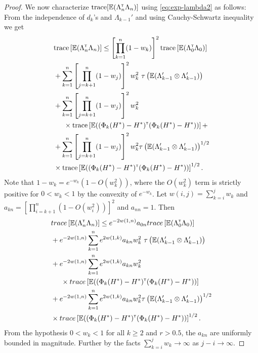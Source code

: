 \begin{proof}
We now characterize $\text{trace}[\mathbb{E}(\Lambda_n^\mathsf{\scriptscriptstyle T} \Lambda_n)]$ using \eqref{eq:exp-lambda2} as follows:
From the independence of $d_k$'s and $\Lambda_{k-1}'$ and using Cauchy-Schwartz inequality we get 
 \begin{align}\label{eq:trace}
 & \text{trace} \left[\mathbb{E} (\Lambda_n ^\mathsf{\scriptscriptstyle T} \Lambda_n)\right] \leq \left[ \prod_{k=1}^n (1-w_k) \right]^2 \text{trace} \left[\mathbb{E} (\Lambda_0 ^\mathsf{\scriptscriptstyle T} \Lambda_0)\right]  \nonumber\\ &+ \sum_{k=1}^n \left[\prod_{j=k+1}^n (1-w_j)\right]^2 w_k^2  \,\,\tau\left(\mathbb{E} (\Lambda_{k-1}' \otimes \Lambda_{k-1}')\right)  \nonumber\\ &+ \sum_{k=1}^n \left[\prod_{j=k+1}^n (1-w_j)\right]^2 w_k^2  \nonumber\\&  \hspace{0.5cm}\times \text{trace}\left[\mathbb{E} ((\Phi_k(H^*) - H^*) ^\mathsf{\scriptscriptstyle T}  (\Phi_k(H^*) - H^*))\right] + \nonumber\\ &+ \sum_{k=1}^n \left[\prod_{j=k+1}^n (1-w_j)\right]^2 w_k^2   \tau\left(\mathbb{E} (\Lambda_{k-1}' \otimes \Lambda_{k-1}')\right)^{1/2} \nonumber\\&  \times \text{trace}\left[\mathbb{E} ((\Phi_k(H^*) - H^*) ^\mathsf{\scriptscriptstyle T}  (\Phi_k(H^*) - H^*))\right]^{1/2}.
 \end{align}
Note that $1-w_k = e^{-w_k}(1-O(w_k^2))$, where the $O(w_k^2)$ term is strictly positive for $0 < w_k <1$ by the convexity of $e^{-w_k}$. Let $w(i,j) = \sum_{k=i}^j w_k$ and $a_{kn} = \left[\prod_{i=k+1}^n (1- O(w_i^2))\right]^2$ and $a_{nn} = 1$. Then
\begin{align}\label{eq:wij}
 & trace \left[\mathbb{E} (\Lambda_n ^\mathsf{\scriptscriptstyle T} \Lambda_n)\right] \leq e^{-2 w(1,n)} a_{0n} trace \left[\mathbb{E} (\Lambda_0 ^\mathsf{\scriptscriptstyle T} \Lambda_0)\right]  \nonumber\\ &+ e^{-2 w(1,n)} \sum_{k=1}^n e^{2 w(1,k)} a_{kn} w_k^2  \,\,\tau\left(\mathbb{E} (\Lambda_{k-1}' \otimes \Lambda_{k-1}')\right)  \nonumber\\ &+ e^{-2 w(1,n)} \sum_{k=1}^n e^{2 w(1,k)} a_{kn} w_k^2  \nonumber\\&  \hspace{0.5cm}\times trace\left[\mathbb{E} ((\Phi_k(H^*) - H^*) ^\mathsf{\scriptscriptstyle T}  (\Phi_k(H^*) - H^*))\right] \nonumber\\ &+ e^{-2 w(1,n)} \sum_{k=1}^n e^{2 w(1,k)} a_{kn} w_k^2  \tau\left(\mathbb{E} (\Lambda_{k-1}' \otimes \Lambda_{k-1}')\right)^{1/2} \nonumber\\&  \times trace\left[\mathbb{E} ((\Phi_k(H^*) - H^*) ^\mathsf{\scriptscriptstyle T}  (\Phi_k(H^*) - H^*))\right]^{1/2}.
 \end{align} 
From the hypothesis $0 < w_k < 1$ for all $k \geq 2$ and $r > 0.5$, the $a_{kn}$ are uniformly bounded in magnitude. Further by the facts $\sum_{k=i}^j w_k \to \infty$ as $j-i \to \infty$.

\end{proof}
